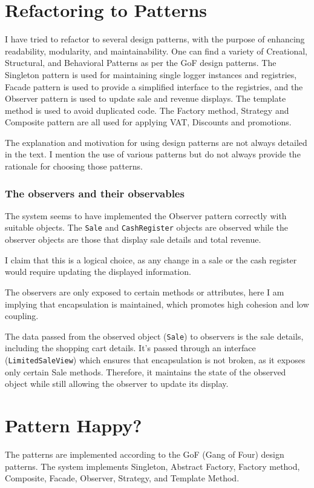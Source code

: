 \documentclass[a4paper]{scrreprt}
\begin{document}
\section*{Refactoring to Patterns}
I have tried to refactor to several design patterns, with the purpose of enhancing readability, modularity, and maintainability.
One can find a variety of Creational, Structural, and Behavioral Patterns as per the GoF design patterns.
The Singleton pattern is used for maintaining single logger instances and registries,
Facade pattern is used to provide a simplified interface to the registries,
and the Observer pattern is used to update sale and revenue displays.
The template method is used to avoid duplicated code.
The Factory method, Strategy and Composite pattern are all used for applying VAT, Discounts and promotions.

The explanation and motivation for using design patterns are not always detailed in the text.
I mention the use of various patterns but do not always provide the rationale for choosing those patterns.

\subsubsection*{The observers and their observables}
The system seems to have implemented the Observer pattern correctly with suitable objects.
The \texttt{Sale} and \texttt{CashRegister} objects are observed while the observer objects
are those that display sale details and total revenue.

I claim that this is a logical choice,
as any change in a sale or the cash register would require updating the displayed information.

The observers are only exposed to certain methods or attributes,
here I am implying that encapsulation is maintained, which promotes high cohesion and low coupling.

The data passed from the observed object (\texttt{Sale}) to observers is the sale details,
including the shopping cart details.
It's passed through an interface (\texttt{LimitedSaleView}) which ensures that encapsulation is not broken,
as it exposes only certain Sale methods.
Therefore, it maintains the state of the observed object while still allowing the observer to update its display.

\section*{Pattern Happy?}
The patterns are implemented according to the GoF (Gang of Four) design patterns.
The system implements Singleton, Abstract Factory, Factory method,
Composite, Facade, Observer, Strategy, and Template Method.
\end{document}
